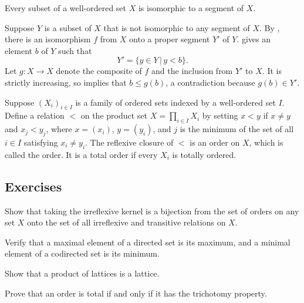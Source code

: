 \documentclass{article}
\begin{document}
\begin{theorem}
  \label{thm:xhbclgwz}
  Every subset of a well-ordered set \(X\) is isomorphic to a segment
  of \(X\).
\end{theorem}

Suppose \(Y\) is a subset of \(X\) that is not isomorphic to any
segment of \(X\).  By , there is an isomorphism
\(f\) from \(X\) onto a proper segment \(Y'\) of \(Y\).
 gives an element \(b\) of \(Y\) such that
\begin{displaymath}
  Y' = \{ y \in Y \,\vert\, y < b \}.
\end{displaymath}
Let \(g : X \to X\) denote the composite of \(f\) and the inclusion
from \(Y'\) to \(X\).  It is strictly increasing, so
 implies that \(b \leq g(b)\), a contradiction
because \(g(b) \in Y'\).

Suppose \((X_i)_{i \in I}\) is a family of ordered sets indexed by a
well-ordered set \(I\).  Define a relation \(<\) on the product set
\(X = \prod_{i \in I} X_i\) by setting \(x < y\) if \(x \neq y\) and
\(x_j < y_j\), where \(x = (x_i)\), \(y = (y_i)\), and \(j\) is the
minimum of the set of all \(i \in I\) satisfying \(x_i \neq y_i\).
The reflexive closure of \(<\) is an order on \(X\), which is called
the  order.  It is a total order if every
\(X_i\) is totally ordered.

\subsection{Exercises}
\label{sec:q1c2w2jy}

\begin{exercise}
  \label{exe:eydusvz3}
  Show that taking the irreflexive kernel is a bijection from the set
  of orders on any set \(X\) onto the set of all irreflexive and
  transitive relations on \(X\).
\end{exercise}

\begin{exercise}
  \label{exe:swjbrepg}
  Verify that a maximal element of a directed set is its maximum, and
  a minimal element of a codirected set is its minimum.
\end{exercise}

\begin{exercise}
  \label{exe:yowl3axc}
  Show that a product of lattices is a lattice.
\end{exercise}

\begin{exercise}
  \label{exe:4knqif5b}
  Prove that an order is total if and only if it has the trichotomy
  property.
\end{exercise}
\end{document}
